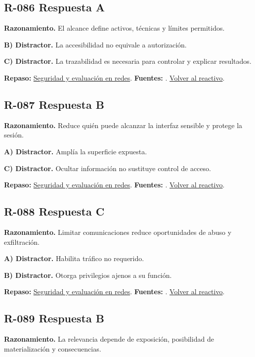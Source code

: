 \subsection*{R-086 \quad Respuesta A}\label{s:R-086}
\textbf{Razonamiento.} El alcance define activos, técnicas y límites permitidos.

\textbf{B) Distractor. }La accesibilidad no equivale a autorización.

\textbf{C) Distractor. }La trazabilidad es necesaria para controlar y explicar resultados.

\textbf{Repaso:} \hyperref[sec:r3]{Seguridad y evaluación en redes}. \textbf{Fuentes:} \cite{nistsecurity,owasp,aes,tls}. \hyperref[q:R-086]{Volver al reactivo}.\par\medskip

\subsection*{R-087 \quad Respuesta B}\label{s:R-087}
\textbf{Razonamiento.} Reduce quién puede alcanzar la interfaz sensible y protege la sesión.

\textbf{A) Distractor. }Amplía la superficie expuesta.

\textbf{C) Distractor. }Ocultar información no sustituye control de acceso.

\textbf{Repaso:} \hyperref[sec:r3]{Seguridad y evaluación en redes}. \textbf{Fuentes:} \cite{nistsecurity,owasp,aes,tls}. \hyperref[q:R-087]{Volver al reactivo}.\par\medskip

\subsection*{R-088 \quad Respuesta C}\label{s:R-088}
\textbf{Razonamiento.} Limitar comunicaciones reduce oportunidades de abuso y exfiltración.

\textbf{A) Distractor. }Habilita tráfico no requerido.

\textbf{B) Distractor. }Otorga privilegios ajenos a su función.

\textbf{Repaso:} \hyperref[sec:r3]{Seguridad y evaluación en redes}. \textbf{Fuentes:} \cite{nistsecurity,owasp,aes,tls}. \hyperref[q:R-088]{Volver al reactivo}.\par\medskip

\subsection*{R-089 \quad Respuesta B}\label{s:R-089}
\textbf{Razonamiento.} La relevancia depende de exposición, posibilidad de materialización y consecuencias.

